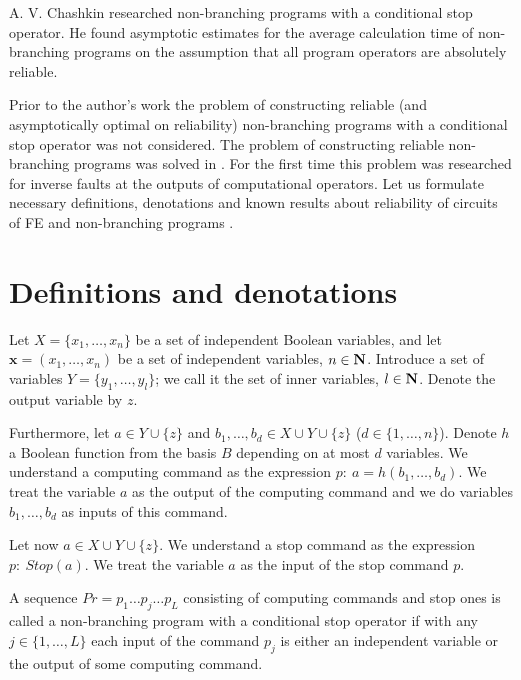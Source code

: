 \documentclass[
11pt,%
tightenlines,%
twoside,%
onecolumn,%
nofloats,%
nobibnotes,%
nofootinbib,%
superscriptaddress,%
noshowpacs,%
centertags]%
{revtex4}
\begin{document}
A. V. Chashkin \cite{2} researched non-branching programs with a conditional stop operator.  He found asymptotic estimates for the average calculation time of non-branching programs on the assumption that all program operators are absolutely reliable.

Prior to the author's work the problem of constructing reliable (and asymptotically optimal on reliability) non-branching programs with a conditional stop operator was not considered. The problem of constructing reliable non-branching programs was solved in \cite{11}. For the first time this problem was researched for inverse faults at the outputs of computational operators. Let us formulate necessary definitions, denotations and known results about reliability of circuits of FE and non-branching programs \cite{12}.

\section{Definitions and denotations}

Let $X = \{x_1,\ldots,x_n\}$ be a set of independent Boolean variables, and let $\mathbf{x} = (x_1,\ldots,x_n)$ be \linebreak a set of
independent variables, $n \in \bf N$. Introduce a set of variables $Y = \{y_1,\ldots,y_l\}$; we call it the set of inner
variables, $l \in \bf N$. Denote the output variable by $z$.

Furthermore, let $a \in Y \cup \{z\}$ and $b_1,\ldots,b_d \in X \cup Y \cup \{z\}$ ($d \in \{1,\ldots,n\}$). Denote $h$ a Boolean
function from the basis $B$ depending on at most $d$ variables. We understand a computing command as
the expression $p: \ a = h(b_1,\ldots,b_d)$. We treat the variable $a$ as the output of the computing command
and we do variables $b_1,\ldots,b_d$ as inputs of this command.

Let now $a \in X \cup Y \cup \{z\}$. We understand a stop command as the expression $p: \ Stop(a)$. \linebreak We treat
the variable $a$ as the input of the stop command $p$.

\begin{definition}A sequence $Pr = p_1 \ldots p_j \ldots p_L$ consisting of computing commands and stop ones is called a
non-branching program with a conditional stop operator if with any $j \in \{1, \ldots ,L\}$ each input of the
command $p_j$ is either an independent variable or the output of some computing command.\end{definition}
\end{document}
